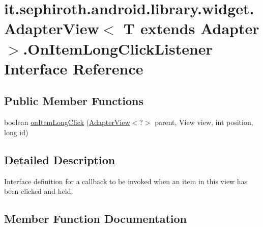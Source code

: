 \hypertarget{interfaceit_1_1sephiroth_1_1android_1_1library_1_1widget_1_1_adapter_view_1_1_on_item_long_click_listener}{}\section{it.\+sephiroth.\+android.\+library.\+widget.\+Adapter\+View$<$ T extends Adapter $>$.On\+Item\+Long\+Click\+Listener Interface Reference}
\label{interfaceit_1_1sephiroth_1_1android_1_1library_1_1widget_1_1_adapter_view_1_1_on_item_long_click_listener}
\subsection*{Public Member Functions}
\begin{DoxyCompactItemize}
\item 
boolean \hyperlink{interfaceit_1_1sephiroth_1_1android_1_1library_1_1widget_1_1_adapter_view_1_1_on_item_long_click_listener_ac083e946ac60a3e58519bace00cd61e5}{on\+Item\+Long\+Click} (\hyperlink{classit_1_1sephiroth_1_1android_1_1library_1_1widget_1_1_adapter_view}{Adapter\+View}$<$?$>$ parent, View view, int position, long id)
\end{DoxyCompactItemize}


\subsection{Detailed Description}
Interface definition for a callback to be invoked when an item in this view has been clicked and held. 

\subsection{Member Function Documentation}
\mbox{\label{interfaceit_1_1sephiroth_1_1android_1_1library_1_1widget_1_1_adapter_view_1_1_on_item_long_click_listener_ac083e946ac60a3e58519bace00cd61e5}} 
